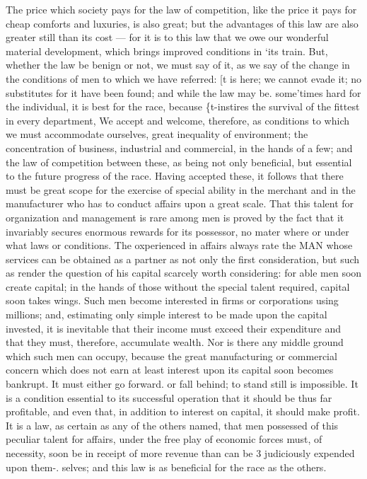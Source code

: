 \documentclass[11pt,openany]{book}
\begin{document}
The price which society pays for the law of competition, like the price it pays for cheap comforts and luxuries, is also great; but the advantages of this law are also greater still than its cost --- for it is to this law that we owe our wonderful material development, which brings improved conditions in `its train. But, whether the law be benign or not, we must say of it, as we say of the change in the conditions of men to which we have referred: [t is here; we cannot evade it; no substitutes for it have been found; and while the law may be. some'times hard for the individual, it is best for the race, because \{t-instires the survival of the fittest in every department, We accept and welcome, therefore, as conditions to which we must accommodate ourselves, great inequality of environment; the concentration of business, industrial and commercial, in the hands of a few; and the law of competition between these, as being not only beneficial, but essential to the future progress of the race. Having accepted these, it follows that there must be great scope for the exercise of special ability in the merchant and in the manufacturer who has to conduct affairs upon a great scale. That this talent for organization and management is rare among men is proved by the fact that it invariably secures enormous rewards for its possessor, no mater where or under what laws or conditions. The oxperienced in affairs always rate the MAN whose services can be obtained as a partner as not only the first consideration, but such as render the question of his capital scarcely worth considering: for able men soon create capital; in the hands of those without the special talent required, capital soon takes wings. Such men become interested in firms or corporations using millions; and, estimating only simple interest to be made upon the capital invested, it is inevitable that their income must exceed their expenditure and that they must, therefore, accumulate wealth. Nor is there any middle ground which such men can occupy, because the great manufacturing or commercial concern which does not earn at least interest upon its capital soon becomes bankrupt. It must either go forward. or fall behind; to stand still is impossible. It is a condition essential to its successful operation that it should be thus far profitable, and even that, in addition to interest on capital, it should make profit. It is a law, as certain as any of the others named, that men possessed of this peculiar talent for affairs, under the free play of economic forces must, of necessity, soon be in receipt of more revenue than can be 3 judiciously expended upon them-. selves; and this law is as beneficial for the race as the others.
\end{document}
